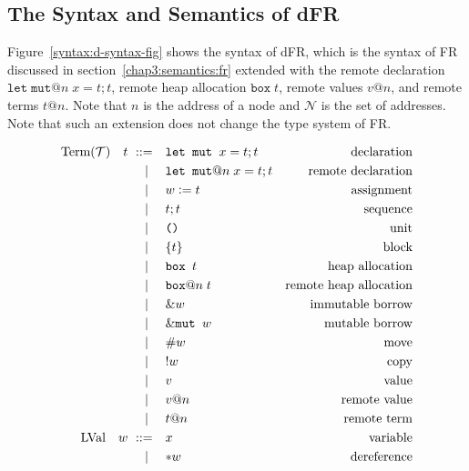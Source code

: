 \subsection{The Syntax and Semantics of dFR} 
\label{chap3:semantics:dfr}
Figure~\ref{syntax:d-syntax-fig} shows the syntax of dFR, which is the syntax of FR discussed in section~\ref{chap3:semantics:fr} extended with the remote declaration $\texttt{let}\;\texttt{mut}@n\; x = t;t$, remote heap allocation $\texttt{box}\;t$, remote values $v@n$, and remote terms $t@n$. Note that $n$ is the address of a node and $\mathcal{N}$ is the set of addresses. Note that such an extension does not change the type system of FR.
\begin{figure}
\begin{alignat*}{3}
    \text{Term}(\mathcal{T}) \quad t \ \metaDeff \quad &\texttt{let mut } x = t;t &\text{declaration}\\
    \cmid \quad &\texttt{let mut}@n\; x = t;t &\text{remote declaration}\\
    \cmid \quad &w \metaDef t &\text{assignment}\\
    \cmid \quad &t;t &\text{sequence}\\
    \cmid \quad &\texttt{()} &\text{unit}\\
    \cmid \quad &\{t\} &\text{block}\\
    \cmid \quad &\texttt{box } t &\text{heap allocation}\\
    \cmid \quad &\texttt{box}@n\; t &\text{remote  heap allocation}\\
    \cmid \quad &\&w \quad &\text{immutable borrow} \\
    \cmid \quad &\&\texttt{mut } w \quad &\text{mutable borrow} \\
    \cmid \quad &\#{w} \quad &\text{move} \\
    \cmid \quad &!{w} \quad &\text{copy} \\
    \cmid \quad &v \quad &\text{value} \\
    \cmid \quad &v@n \quad &\text{remote value}\\
    \cmid \quad &t@n \quad &\text{remote term}\\
    \text{LVal} \quad w \ \metaDeff \quad &x \quad &\text{variable} \\
    \cmid \quad &{*}w \quad &\text{dereference} \\

\end{alignat*}
\end{figure}
